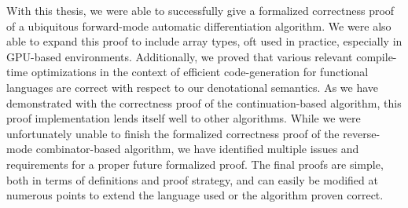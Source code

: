 With this thesis, we were able to successfully give a formalized correctness proof of a ubiquitous forward-mode automatic differentiation algorithm.
We were also able to expand this proof to include array types, oft used in practice, especially in GPU-based environments.
Additionally, we proved that various relevant compile-time optimizations in the context of efficient code-generation for functional languages are correct with respect to our denotational semantics.
As we have demonstrated with the correctness proof of the continuation-based algorithm, this proof implementation lends itself well to other algorithms.
While we were unfortunately unable to finish the formalized correctness proof of the reverse-mode combinator-based algorithm, we have identified multiple issues and requirements for a proper future formalized proof.
The final proofs are simple, both in terms of definitions and proof strategy, and can easily be modified at numerous points to extend the language used or the algorithm proven correct.
